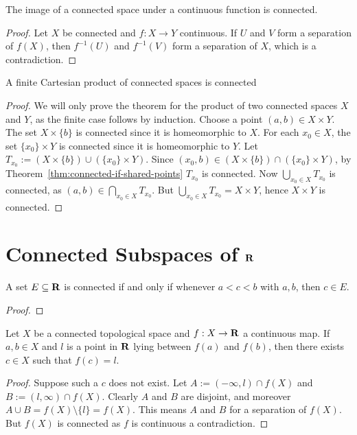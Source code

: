 \begin{theorem}
The image of a connected space under a continuous function is connected.
\end{theorem}
    \begin{proof}
        Let $X$ be connected and $f:X \rightarrow Y$ continuous. If $U$ and $V$ form a separation of $f(X)$, then $f^{-1}(U)$ and $f^{-1}(V)$ form a separation of $X$, which is a contradiction.
    \end{proof}

\begin{theorem}
    A finite Cartesian product of connected spaces is connected
\end{theorem}
    \begin{proof}
        We will only prove the theorem for the product of two connected spaces $X$ and $Y$, as the finite case follows by induction. Choose a point $(a,b) \in X \times Y$. The set $X \times \{b\}$ is connected since it is homeomorphic to $X$. For each $x_0 \in X$, the set $\{x_0\} \times Y$ is connected since it is homeomorphic to $Y$. Let $T_{x_0} := (X \times \{b\}) \cup (\{x_0\} \times Y)$. Since $(x_0,b) \in (X \times \{b\}) \cap (\{x_0\} \times Y)$, by Theorem~\ref{thm:connected-if-shared-points} $T_{x_0}$ is connected. Now $\bigcup_{x_0 \in X}T_{x_0}$ is connected, as $(a,b) \in \bigcap_{x_0 \in X}T_{x_0}$. But $\bigcup_{x_0 \in X}T_{x_0} = X \times Y$, hence $X \times Y$ is connected.
    \end{proof}

\section{Connected Subspaces of $\mathbf{R}$}

\begin{theorem}
    A set $E \subseteq \mathbf{R}$ is connected if and only if whenever $a < c < b$ with $a,b$, then $c \in E$.
\end{theorem}
    {\color{red} \begin{proof}

    \end{proof}}

\begin{theorem}
    Let $X$ be a connected topological space and $f:X \rightarrow \mathbf{R}$ a continuous map. If $a,b \in X$ and $l$ is a point in $\mathbf{R}$ lying between $f(a)$ and $f(b)$, then there exists $c \in X$ such that $f(c) = l$.
\end{theorem}
    \begin{proof}
        Suppose such a $c$ does not exist. Let $A := (-\infty,l) \cap f(X)$ and $B:= (l,\infty) \cap f(X)$. Clearly $A$ and $B$ are disjoint, and moreover $A \cup B = f(X) \setminus \{l\} = f(X)$. This means $A$ and $B$ for a separation of $f(X)$. But $f(X)$ is connected as $f$ is continuous \textemdash a contradiction.
    \end{proof}

